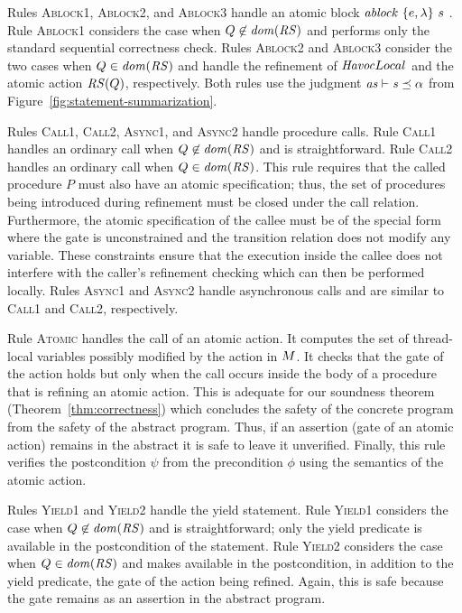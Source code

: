 Rules \textsc{Ablock1}, \textsc{Ablock2}, and \textsc{Ablock3} handle an atomic block $\mathit{ablock}\ {\{e,\lambda\}}\ {s}\ $.
Rule \textsc{Ablock1} considers the case when $Q \not \in \mathit{dom}(\mathit{RS})$ and performs only the 
standard sequential correctness check.
Rules \textsc{Ablock2} and \textsc{Ablock3} consider the two cases when $Q \in \mathit{dom}(\mathit{RS})$ and handle
the refinement of $\mathit{Havoc}{Local}$ and the atomic action $\mathit{RS}(Q)$, respectively.
Both rules use the judgment $\mathit{as} \vdash \mathit{s} \preceq \alpha$ from Figure~\ref{fig:statement-summarization}.

Rules \textsc{Call1}, \textsc{Call2}, \textsc{Async1}, and \textsc{Async2} handle procedure calls.
Rule \textsc{Call1} handles an ordinary call when $Q \not \in \mathit{dom}(\mathit{RS})$ and is straightforward.
Rule \textsc{Call2} handles an ordinary call when $Q \in \mathit{dom}(\mathit{RS})$.
This rule requires that the called procedure $P$ must also have an atomic specification;
thus, the set of procedures being introduced during refinement must be closed under the call relation.
Furthermore, the atomic specification of the callee must be of the special form
where the gate is unconstrained and the transition relation does not modify any variable.
These constraints ensure that the execution inside the callee does not interfere with the caller's refinement checking 
which can then be performed locally.
Rules \textsc{Async1} and \textsc{Async2} handle asynchronous calls and are similar to \textsc{Call1} and \textsc{Call2}, respectively.

Rule \textsc{Atomic} handles the call of an atomic action.
It computes the set of thread-local variables possibly modified by the action in $M$.
It checks that the gate of the action holds but only when the call occurs inside the body of a procedure 
that is refining an atomic action.
This is adequate for our soundness theorem (Theorem~\ref{thm:correctness}) which concludes the safety of the concrete 
program from the safety of the abstract program.
Thus, if an assertion (gate of an atomic action) remains in the abstract it is safe to leave it unverified.
Finally, this rule verifies the postcondition $\psi$ from the precondition $\phi$ using the semantics of the atomic action.

Rules \textsc{Yield1} and \textsc{Yield2} handle the yield statement.
Rule \textsc{Yield1} considers the case when $Q \not \in \mathit{dom}(\mathit{RS})$ and is straightforward;
only the yield predicate is available in the postcondition of the statement.
Rule \textsc{Yield2} considers the case when $Q \in \mathit{dom}(\mathit{RS})$ and makes available in the postcondition, in 
addition to the yield predicate, the gate of the action being refined.
Again, this is safe because the gate remains as an assertion in the abstract program.

